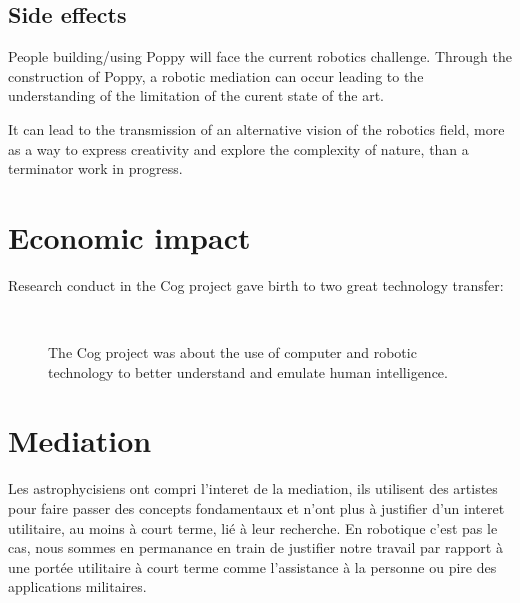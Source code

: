 \subsection{Side effects} %
People building/using Poppy will face the current robotics challenge. Through the construction of Poppy, a robotic mediation can occur leading to the understanding of the limitation of the curent state of the art.

It can lead to the transmission of an alternative vision of the robotics field, more as a way to express creativity and explore the complexity of nature, than a terminator work in progress.




\section{Economic impact} %

Research conduct in the Cog project gave birth to two great technology transfer:

\begin{figure}[t]
\centering
    \hfil
     \\
    \hfil
    \caption{The Cog project was about the use of computer and robotic technology to better understand and emulate human intelligence.}
    \label{}
\end{figure}


\section{Mediation} %
Les astrophycisiens ont compri l'interet de la mediation, ils utilisent des artistes pour faire passer des concepts fondamentaux et n'ont plus à justifier d'un interet utilitaire, au moins à court terme, lié à leur recherche.
En robotique c'est pas le cas, nous sommes en permanance en train de justifier notre travail par rapport à une portée utilitaire à court terme comme l'assistance à la personne ou pire des applications militaires.

